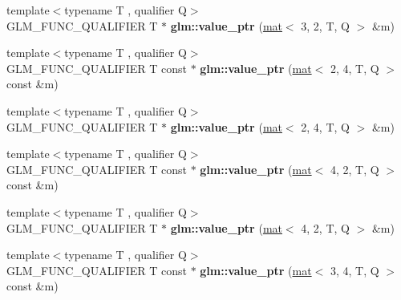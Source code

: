 \begin{DoxyCompactItemize}
\item 
\mbox{\label{group__gtc__type__ptr_gacd2f2c950912a073f6f77494df9e42a6}} 
{\footnotesize template$<$typename T , qualifier Q$>$ }\\G\+L\+M\+\_\+\+F\+U\+N\+C\+\_\+\+Q\+U\+A\+L\+I\+F\+I\+ER T $\ast$ {\bfseries glm\+::value\+\_\+ptr} (\hyperlink{structglm_1_1mat}{mat}$<$ 3, 2, T, Q $>$ \&m)
\item 
\mbox{\label{group__gtc__type__ptr_ga81f821818736c8cb80a899cf5819aac9}} 
{\footnotesize template$<$typename T , qualifier Q$>$ }\\G\+L\+M\+\_\+\+F\+U\+N\+C\+\_\+\+Q\+U\+A\+L\+I\+F\+I\+ER T const  $\ast$ {\bfseries glm\+::value\+\_\+ptr} (\hyperlink{structglm_1_1mat}{mat}$<$ 2, 4, T, Q $>$ const \&m)
\item 
\mbox{\label{group__gtc__type__ptr_ga4c03b3900c5a82d8915b0c8c6d5dce4e}} 
{\footnotesize template$<$typename T , qualifier Q$>$ }\\G\+L\+M\+\_\+\+F\+U\+N\+C\+\_\+\+Q\+U\+A\+L\+I\+F\+I\+ER T $\ast$ {\bfseries glm\+::value\+\_\+ptr} (\hyperlink{structglm_1_1mat}{mat}$<$ 2, 4, T, Q $>$ \&m)
\item 
\mbox{\label{group__gtc__type__ptr_gaf8be997c8fa6dea9773f195e35f2df05}} 
{\footnotesize template$<$typename T , qualifier Q$>$ }\\G\+L\+M\+\_\+\+F\+U\+N\+C\+\_\+\+Q\+U\+A\+L\+I\+F\+I\+ER T const  $\ast$ {\bfseries glm\+::value\+\_\+ptr} (\hyperlink{structglm_1_1mat}{mat}$<$ 4, 2, T, Q $>$ const \&m)
\item 
\mbox{\label{group__gtc__type__ptr_gabf9cfd331a42dd9feb54a5cbc858509a}} 
{\footnotesize template$<$typename T , qualifier Q$>$ }\\G\+L\+M\+\_\+\+F\+U\+N\+C\+\_\+\+Q\+U\+A\+L\+I\+F\+I\+ER T $\ast$ {\bfseries glm\+::value\+\_\+ptr} (\hyperlink{structglm_1_1mat}{mat}$<$ 4, 2, T, Q $>$ \&m)
\item 
\mbox{\label{group__gtc__type__ptr_gaf93bd83ae6520e9cdafdcd3f483dfeb3}} 
{\footnotesize template$<$typename T , qualifier Q$>$ }\\G\+L\+M\+\_\+\+F\+U\+N\+C\+\_\+\+Q\+U\+A\+L\+I\+F\+I\+ER T const  $\ast$ {\bfseries glm\+::value\+\_\+ptr} (\hyperlink{structglm_1_1mat}{mat}$<$ 3, 4, T, Q $>$ const \&m)

\end{DoxyCompactItemize}
